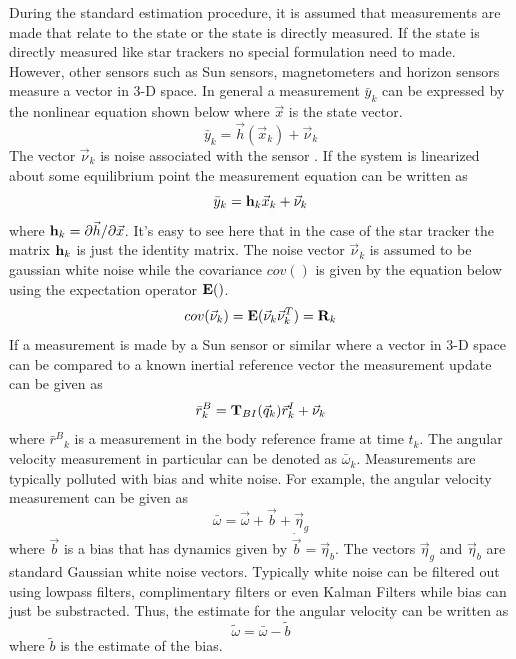During the standard estimation procedure, it is assumed that
measurements are made that relate to the state or the state is
directly measured. If the state is directly measured like star trackers no special formulation need to
made. However, other sensors such as Sun sensors, magnetometers and
horizon sensors measure a vector in 3-D space. In general a
measurement $\bar{y}_k$ can be expressed by the nonlinear equation
shown below where $\vec{x}$ is the state vector. 
\begin{equation}
  \bar{y}_k = \vec{h}(\vec{x}_k) + \vec{\nu}_k
\end{equation}
The vector $\vec{\nu}_k$ is noise associated with the sensor
\cite{Munoz,cassidis}. If the system is linearized about some
equilibrium point the measurement equation can be written as
\begin{equation}
  \bar{y}_k = {\bf h}_k\vec{x}_k + \vec{\nu}_k
\end{equation}
where ${\bf h}_k = \partial \vec{h}/\partial \vec{x}$. 
It's easy to see here that in the case of the star tracker the matrix
${\bf h}_k$ is just the identity matrix. The noise vector
$\vec{\nu}_k$ is assumed to be gaussian white noise while the
covariance $cov()$ is given by the equation below using the
expectation operator ${\bf E}()$.
\begin{equation}
  cov(\vec{\nu}_k) = {\bf E}(\vec{\nu}_k\vec{\nu}_k^T) = {\bf R}_k
\end{equation}
If a measurement is made by a
Sun sensor or similar where a vector in 3-D space can be compared to a
known inertial reference vector the measurement update can be given as 
\begin{equation}
  {\bar{r}^B}_k = {\bf T}_{BI}(\vec{q}_k){\vec{r}^I}_k + \vec{\nu}_k
\end{equation}
where ${\bar{r}^B}_k$ is a measurement in the body reference frame at
time $t_k$. The angular velocity measurement in particular can be denoted as
$\bar{\omega}_k$. Measurements are typically polluted with bias and
white noise. For example, the angular velocity measurement can be
given as
\begin{equation}
  \bar{\omega} = \vec{\omega} + \vec{b} + \vec{\eta}_g
\end{equation}
where $\vec{b}$ is a bias that has dynamics given by
$\dot{\vec{b}}=\vec{\eta}_b$. The vectors $\vec{\eta}_g$ and
$\vec{\eta}_b$ are standard Gaussian white noise vectors. Typically
white noise can be filtered out using lowpass filters, complimentary
filters or even Kalman Filters while bias can just be
substracted. Thus, the estimate for the angular velocity can be
written as
\begin{equation}
  \tilde{\omega} = \bar{\omega}-\tilde{b}
\end{equation}
where $\tilde{b}$ is the estimate of the bias.

